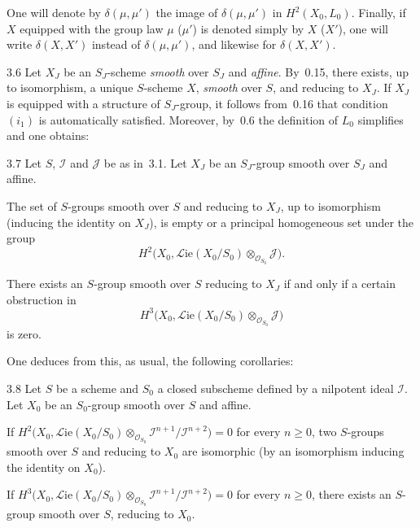 One will denote by \(\delta(\mu,\mu')\) the image of \(\delta(\mu,\mu')\) in
\(H^{2}(X_{0},L_{0})\). Finally, if \(X\) equipped with the group law \(\mu\)
(\resp \(\mu'\)) is denoted simply by \(X\) (\resp \(X'\)), one will write
\(\delta(X,X')\) instead of \(\delta(\mu,\mu')\), and likewise for
\(\delta(X,X')\).

\begin{remark}{3.6}\label{III.3.6}
Let \(X_{J}\) be an \(S_{J}\)-scheme \emph{smooth} over \(S_{J}\) and
\emph{affine}. By~0.15, there exists, up to isomorphism, a unique
\(S\)-scheme \(X\), \emph{smooth} over \(S\), and reducing to \(X_{J}\). If
\(X_{J}\) is equipped with a structure of \(S_{J}\)-group, it follows
from~0.16 that condition \((i_{1})\) is automatically satisfied. Moreover,
by~0.6 the definition of \(L_{0}\) simplifies and one obtains:
\end{remark}

\begin{corollary}{3.7}\label{III.3.7}
Let \(S\), \(\mathcal{I}\) and \(\mathcal{J}\) be as in~3.1. Let \(X_{J}\)
be an \(S_{J}\)-group smooth over \(S_{J}\) and affine.
\begin{enumeratei}
\item The set of \(S\)-groups smooth over \(S\) and reducing to \(X_{J}\),
up to isomorphism (inducing the identity on \(X_{J}\)), is empty or a
principal homogeneous set under the group
\[
H^{2}\bigl(X_{0},\mathcal{L}\mathrm{ie}(X_{0}/S_{0})
  \otimes_{\mathcal{O}_{S_{0}}}\mathcal{J}\bigr).
\]
\item There exists an \(S\)-group smooth over \(S\) reducing to \(X_{J}\) if
and only if a certain obstruction in
\[
H^{3}\bigl(X_{0},\mathcal{L}\mathrm{ie}(X_{0}/S_{0})
  \otimes_{\mathcal{O}_{S_{0}}}\mathcal{J}\bigr)
\]
is zero.
\end{enumeratei}
\end{corollary}

One deduces from this, as usual, the following corollaries:

\begin{corollary}{3.8}\label{III.3.8}
Let \(S\) be a scheme and \(S_{0}\) a closed subscheme defined by a
nilpotent ideal \(\mathcal{I}\). Let \(X_{0}\) be an \(S_{0}\)-group smooth
over \(S\) and affine.%
\begin{enumeratei}
\item If
\(H^{2}\bigl(X_{0},\mathcal{L}\mathrm{ie}(X_{0}/S_{0})
  \otimes_{\mathcal{O}_{S_{0}}}\mathcal{I}^{n+1}/\mathcal{I}^{n+2}\bigr)=0\)
for every \(n\geqslant 0\), two \(S\)-groups smooth over \(S\) and reducing
to \(X_{0}\) are isomorphic (by an isomorphism inducing the identity on
\(X_{0}\)).
\item If
\(H^{3}\bigl(X_{0},\mathcal{L}\mathrm{ie}(X_{0}/S_{0})
  \otimes_{\mathcal{O}_{S_{0}}}\mathcal{I}^{n+1}/\mathcal{I}^{n+2}\bigr)=0\)
for every \(n\geqslant 0\), there exists an \(S\)-group smooth over \(S\),
reducing to \(X_{0}\).
\end{enumeratei}
\end{corollary}

